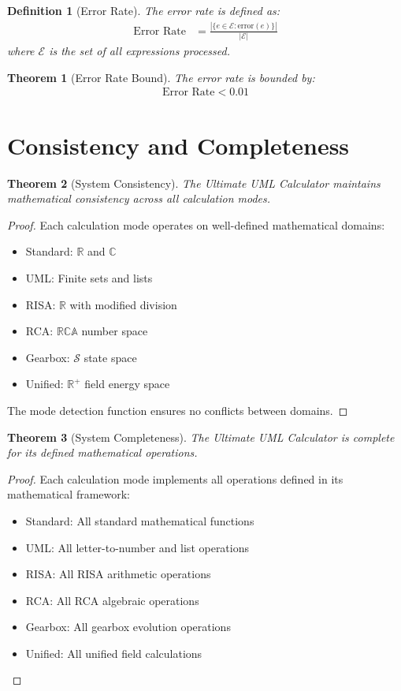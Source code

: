 \documentclass[12pt,a4paper]{article}
\newtheorem{definition}{Definition}
\newtheorem{theorem}{Theorem}
\begin{document}
\begin{definition}[Error Rate]
The error rate is defined as:
\begin{align}
\text{Error Rate} &= \frac{|\{e \in \mathcal{E} : \text{error}(e)\}|}{|\mathcal{E}|}
\end{align}
where $\mathcal{E}$ is the set of all expressions processed.
\end{definition}

\begin{theorem}[Error Rate Bound]
The error rate is bounded by:
\begin{align}
\text{Error Rate} < 0.01
\end{align}
\end{theorem}

\section{Consistency and Completeness}

\begin{theorem}[System Consistency]
The Ultimate UML Calculator maintains mathematical consistency across all calculation modes.
\end{theorem}

\begin{proof}
Each calculation mode operates on well-defined mathematical domains:
\begin{itemize}
\item Standard: $\mathbb{R}$ and $\mathbb{C}$
\item UML: Finite sets and lists
\item RISA: $\mathbb{R}$ with modified division
\item RCA: $\mathbb{RCA}$ number space
\item Gearbox: $\mathcal{S}$ state space
\item Unified: $\mathbb{R}^+$ field energy space
\end{itemize}

The mode detection function ensures no conflicts between domains.
\end{proof}

\begin{theorem}[System Completeness]
The Ultimate UML Calculator is complete for its defined mathematical operations.
\end{theorem}

\begin{proof}
Each calculation mode implements all operations defined in its mathematical framework:
\begin{itemize}
\item Standard: All standard mathematical functions
\item UML: All letter-to-number and list operations
\item RISA: All RISA arithmetic operations
\item RCA: All RCA algebraic operations
\item Gearbox: All gearbox evolution operations
\item Unified: All unified field calculations
\end{itemize}
\end{proof}
\end{document}
